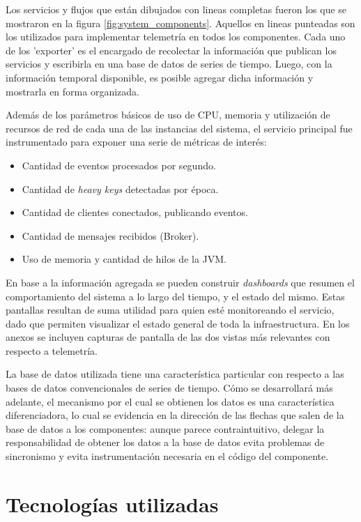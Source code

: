 \documentclass[a4paper,10pt, oneside]{article}
\begin{document}
Los servicios y flujos que están dibujados con lineas completas fueron los que se mostraron en la figura \ref{fig:system_components}. Aquellos en lineas punteadas son los utilizados para implementar telemetría en todos los componentes. Cada uno de los 'exporter' es el encargado de recolectar la información que publican los servicios y escribirla en una base de datos de series de tiempo. Luego, con la información temporal disponible, es posible agregar dicha información y mostrarla en forma organizada.

Además de los parámetros básicos de uso de CPU, memoria y utilización de recursos de red de cada una de las instancias del sistema, el servicio principal fue instrumentado para exponer una serie de métricas de interés:

\begin{itemize}
	\item Cantidad de eventos procesados por segundo.
	\item Cantidad de \textit{heavy keys} detectadas por época.
	\item Cantidad de clientes conectados, publicando eventos.
	\item Cantidad de mensajes recibidos (Broker).
	\item Uso de memoria y cantidad de hilos de la JVM.
\end{itemize}

En base a la información agregada se pueden construir \textit{dashboards} que resumen el comportamiento del sistema a lo largo del tiempo, y el estado del mismo. Estas pantallas resultan de suma utilidad para quien esté monitoreando el servicio, dado que permiten visualizar el estado general de toda la infraestructura. En los anexos se incluyen capturas de pantalla de las dos vistas más relevantes con respecto a telemetría.

La base de datos utilizada tiene una característica particular con respecto a las bases de datos convencionales de series de tiempo. Cómo se desarrollará más adelante, el mecanismo por el cual se obtienen los datos es una característica diferenciadora, lo cual se evidencia en la dirección de las flechas que salen de la base de datos a los componentes: aunque parece contraintuitivo, delegar la responsabilidad de obtener los datos a la base de datos evita problemas de sincronismo y evita instrumentación necesaria en el código del componente.

\newpage

\section{Tecnologías utilizadas}\label{sec:tecnologias_utilizadas}
\end{document}
